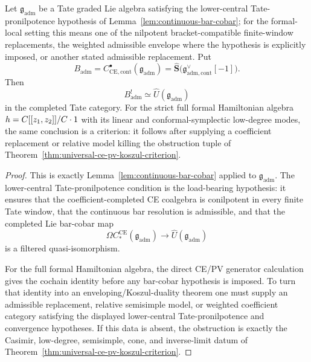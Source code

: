 \documentclass[11pt]{memoir}
\begin{document}
\begin{prop}\label{prop:ce-koszul}
  Let \(\mathfrak g_{\mathrm{adm}}\) be a Tate graded Lie algebra satisfying
  the lower-central Tate-pronilpotence hypothesis of
  Lemma~\ref{lem:continuous-bar-cobar};
	  for the formal-local setting this means one of the nilpotent
	  bracket-compatible finite-window replacements,
  the weighted admissible envelope where the hypothesis is explicitly
  imposed, or another stated admissible replacement. Put
  \[
    B_{\mathrm{adm}}
      =C^\bullet_{\mathrm{CE},\mathrm{cont}}(\mathfrak g_{\mathrm{adm}})
      =\widehat{\mathbf S}
       \bigl(\mathfrak g_{\mathrm{adm},\mathrm{cont}}^\vee[-1]\bigr).
  \]
  Then
  \[
    B_{\mathrm{adm}}^!\simeq
    \widehat U(\mathfrak g_{\mathrm{adm}})
  \]
  in the completed Tate category.  For the strict full formal Hamiltonian
  algebra \(h=C[[z_1,z_2]]/C\cdot1\) with its linear and
  conformal-symplectic low-degree modes, the same conclusion is a
  criterion: it follows after supplying a coefficient replacement or
  relative model killing the obstruction tuple of
  Theorem~\ref{thm:universal-ce-pv-koszul-criterion}.
\end{prop}

\begin{proof}
  This is exactly Lemma~\ref{lem:continuous-bar-cobar} applied to
  \(\mathfrak g_{\mathrm{adm}}\).  The lower-central
  Tate-pronilpotence condition is the load-bearing hypothesis: it ensures that the coefficient-completed
  CE coalgebra is conilpotent in every finite Tate window, that the
  continuous bar resolution is admissible, and that the completed
  Lie bar-cobar map
  \[
    \Omega C_*^{\mathrm{CE}}(\mathfrak g_{\mathrm{adm}})
      \longrightarrow
    \widehat U(\mathfrak g_{\mathrm{adm}})
  \]
  is a filtered quasi-isomorphism.

  For the full formal Hamiltonian algebra, the direct CE/PV generator
  calculation gives the cochain identity before any bar-cobar hypothesis
  is imposed.  To turn that identity into an enveloping/Koszul-duality
  theorem one must supply an admissible replacement, relative semisimple
  model, or weighted coefficient category satisfying the displayed
  lower-central Tate-pronilpotence and convergence hypotheses.  If this data is absent, the
  obstruction is exactly the Casimir, low-degree, semisimple, cone, and
  inverse-limit datum of
  Theorem~\ref{thm:universal-ce-pv-koszul-criterion}.
\end{proof}
\end{document}
